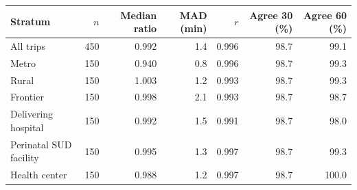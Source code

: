\begin{tabular}{@{}lrrrrrr@{}}
\toprule
Stratum & $n$ & Median ratio & MAD (min) & $r$ & Agree 30 (\%) & Agree 60 (\%) \\
\midrule
All trips & 450 & 0.992 & 1.4 & 0.996 & 98.7 & 99.1 \\
\addlinespace
Metro & 150 & 0.940 & 0.8 & 0.996 & 98.7 & 99.3 \\
Rural & 150 & 1.003 & 1.2 & 0.993 & 98.7 & 99.3 \\
Frontier & 150 & 0.998 & 2.1 & 0.993 & 98.7 & 98.7 \\
\addlinespace
Delivering hospital & 150 & 0.992 & 1.5 & 0.991 & 98.7 & 98.0 \\
Perinatal SUD facility & 150 & 0.995 & 1.3 & 0.997 & 98.7 & 99.3 \\
Health center & 150 & 0.988 & 1.2 & 0.997 & 98.7 & 100.0 \\
\bottomrule
\end{tabular}
